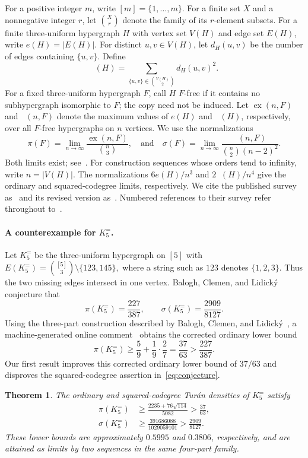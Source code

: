 \documentclass[11pt]{article}
\newtheorem{theorem}{Theorem}[section]
\theoremstyle{remark}
\numberwithin{equation}{section}
\DeclareMathOperator{\co}{co_2}
\DeclareMathOperator{\ex}{ex}
\DeclareMathOperator{\exco}{exco_2}
\newcommand{\F}{K_5^{=}}
\begin{document}
For a positive integer $m$, write $[m]=\{1,\ldots,m\}$. For a finite
set $X$ and a nonnegative integer $r$, let $\binom Xr$ denote the family
of its $r$-element subsets.
For a finite three-uniform hypergraph $H$ with vertex set $V(H)$ and
edge set $E(H)$, write $e(H)=|E(H)|$. For distinct $u,v\in V(H)$,
let $d_H(u,v)$ be the number of edges containing $\{u,v\}$. Define
\[
 \co(H)=\sum_{\{u,v\}\in\binom{V(H)}2}d_H(u,v)^2.
\]
For a fixed three-uniform hypergraph $F$, call $H$ $F$-free if it contains
no subhypergraph isomorphic to $F$; the copy need not be induced.
Let $\ex(n,F)$ and $\exco(n,F)$ denote the
maximum values of $e(H)$ and $\co(H)$, respectively, over all $F$-free
hypergraphs on $n$ vertices. We use the normalizations
\begin{equation*}
 \pi(F)=\lim_{n\to\infty}\frac{\ex(n,F)}{\binom n3},
 \quad
 \text{and}
 \quad
 \sigma(F)=\lim_{n\to\infty}
 \frac{\exco(n,F)}{\binom n2(n-2)^2}.
\end{equation*}
Both limits exist; see~\cite[Section~1]{BCL}. For construction sequences
whose orders tend to infinity, write $n=|V(H)|$. The normalizations
$6e(H)/n^3$ and $2\co(H)/n^4$ give the ordinary and squared-codegree
limits, respectively.
We cite the published survey as~\cite{BCLpublished}
and its revised version as~\cite{BCL}. Numbered references to their
survey refer throughout to~\cite{BCL}.

\paragraph{A counterexample for $K_5^{=}$.}
Let $\F$ be the three-uniform hypergraph on $[5]$ with
\(E(\F)=\binom{[5]}3\setminus\{123,145\},
\)
where a string such as $123$ denotes $\{1,2,3\}$. Thus the two missing
edges intersect in one vertex. Balogh, Clemen, and
Lidick\'y~\cite[Conjecture~3.6]{BCL} conjecture that
\begin{equation}\label{eq:conjecture}
 \pi(\F)=\frac{227}{387},\qquad
 \sigma(\F)=\frac{2909}{8127}.
\end{equation}
Using the three-part construction described by Balogh, Clemen, and
Lidick\'y~\cite[Section~3.19]{BCL}, a machine-generated online
comment~\cite[comment~1]{ProbXiv} obtains the corrected ordinary lower bound
\[
 \pi(\F)\ge\frac59+\frac19\cdot\frac27
 =\frac{37}{63}>\frac{227}{387}.
\]
Our first result improves this corrected ordinary lower bound of $37/63$
and disproves the squared-codegree assertion in~\eqref{eq:conjecture}.

\begin{theorem}\label{thm:main}
The ordinary and squared-codegree Tur\'an densities of $\F$ satisfy
\begin{align}
 \pi(\F)&\ge\frac{2235+76\sqrt{114}}{5082}>\frac{37}{63},
           \label{eq:mainordinary}\\
 \sigma(\F)&\ge\frac{391686088}{1029059101}>\frac{2909}{8127}.
           \label{eq:mainsquared}
\end{align}
These lower bounds are approximately $0.5995$ and $0.3806$,
respectively, and are attained as limits by two sequences in the same
four-part family.
\end{theorem}
\end{document}
